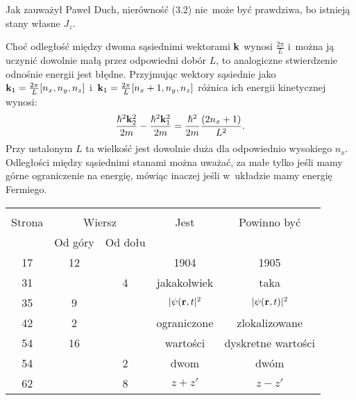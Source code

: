 \documentclass[a4paper,11pt]{article}
\begin{document}
\noindent
{} Jak zauważył Paweł Duch, nierówność (3.2)
nie~może być prawdziwa, bo istnieją stany własne $J_{ z }$.

\vspace{\spaceFour}



\noindent
{} Choć odległość między dwoma sąsiednimi
wektorami $\mathbf{k}$ wynosi $\frac{ 2 \pi }{ L }$ i~można ją
uczynić dowolnie małą przez odpowiedni dobór $L$, to analogiczne
stwierdzenie odnośnie energii jest błędne. Przyjmując wektory
sąsiednie jako
$\mathbf{k}_{ 1 } = \frac{ 2 \pi }{ L } [ n_{ x }, n_{ y }, n_{ z } ]$
i~$\mathbf{k}_{ 1 } = \frac{ 2 \pi }{ L } [ n_{ x } + 1, n_{ y }, n_{ z } ]$
różnica ich energii kinetycznej wynosi:
\begin{equation}
  \label{eq:Schiff-01}
  \frac{ \hbar^{ 2 } \mathbf{k}_{ 2 }^{ 2 } }{ 2 m }
  - \frac{ \hbar^{ 2 } \mathbf{k}_{ 1 }^{ 2 } }{ 2 m }
  = \frac{ \hbar^{ 2 } }{ 2 m } \frac{ ( 2 n_{ x } + 1 ) }{ L^{ 2 } }.
\end{equation}
Przy ustalonym $L$ ta wielkość jest dowolnie duża dla odpowiednio
wysokiego $n_{ x }$. Odległości między sąsiednimi stanami można
uważać, za małe tylko jeśli mamy górne ograniczenie na energię,
mówiąc inaczej jeśli w~układzie mamy energię Fermiego.







\begin{center}

  \begin{tabular}{|c|c|c|c|c|}
    \hline
    & \multicolumn{2}{c|}{} & & \\
    Strona & \multicolumn{2}{c|}{Wiersz} & Jest
                              & Powinno być \\ \cline{2-3}
    & Od góry & Od dołu & & \\
    \hline
    17 & 12 & & 1904 & 1905 \\
    31 & & 4 & jakakolwiek & taka \\
    35 & 9 & & $| \psi( \mathbf{r}, t |^{ 2 }$ & $| \psi( \mathbf{r}, t ) |^{ 2 }$ \\
    42 & 2 & & ograniczone & zlokalizowane \\
    54 & 16 & & wartości & dyskretne wartości \\
    54 & & 2 & dwom & dwóm \\
    62 & & 8 & $z + z'$ & $z - z'$ \\
    \hline
  \end{tabular}

\end{center}
\end{document}
